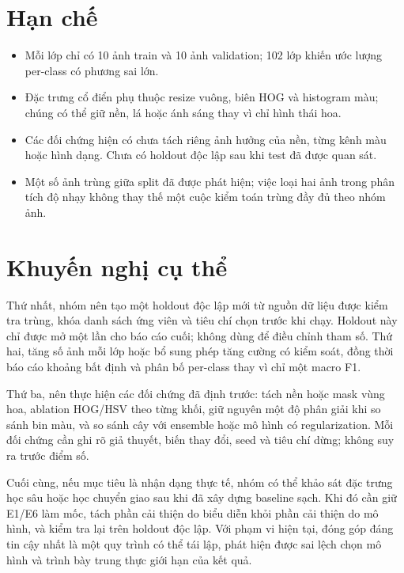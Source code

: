 \section{Hạn chế}
\begin{itemize}
\item Mỗi lớp chỉ có 10 ảnh train và 10 ảnh validation; 102 lớp khiến ước lượng per-class có phương sai lớn.
\item Đặc trưng cổ điển phụ thuộc resize vuông, biên HOG và histogram màu; chúng có thể giữ nền, lá hoặc ánh sáng thay vì chỉ hình thái hoa.
\item Các đối chứng hiện có chưa tách riêng ảnh hưởng của nền, từng kênh màu hoặc hình dạng. Chưa có holdout độc lập sau khi test đã được quan sát.
\item Một số ảnh trùng giữa split đã được phát hiện; việc loại hai ảnh trong phân tích độ nhạy không thay thế một cuộc kiểm toán trùng đầy đủ theo nhóm ảnh.
\end{itemize}

\section{Khuyến nghị cụ thể}
Thứ nhất, nhóm nên tạo một holdout độc lập mới từ nguồn dữ liệu được kiểm tra trùng, khóa danh sách ứng viên và tiêu chí chọn trước khi chạy. Holdout này chỉ được mở một lần cho báo cáo cuối; không dùng để điều chỉnh tham số. Thứ hai, tăng số ảnh mỗi lớp hoặc bổ sung phép tăng cường có kiểm soát, đồng thời báo cáo khoảng bất định và phân bố per-class thay vì chỉ một macro F1.

Thứ ba, nên thực hiện các đối chứng đã định trước: tách nền hoặc mask vùng hoa, ablation HOG/HSV theo từng khối, giữ nguyên một độ phân giải khi so sánh bin màu, và so sánh cây với ensemble hoặc mô hình có regularization. Mỗi đối chứng cần ghi rõ giả thuyết, biến thay đổi, seed và tiêu chí dừng; không suy ra trước điểm số.

Cuối cùng, nếu mục tiêu là nhận dạng thực tế, nhóm có thể khảo sát đặc trưng học sâu hoặc học chuyển giao sau khi đã xây dựng baseline sạch. Khi đó cần giữ E1/E6 làm mốc, tách phần cải thiện do biểu diễn khỏi phần cải thiện do mô hình, và kiểm tra lại trên holdout độc lập. Với phạm vi hiện tại, đóng góp đáng tin cậy nhất là một quy trình có thể tái lập, phát hiện được sai lệch chọn mô hình và trình bày trung thực giới hạn của kết quả.
